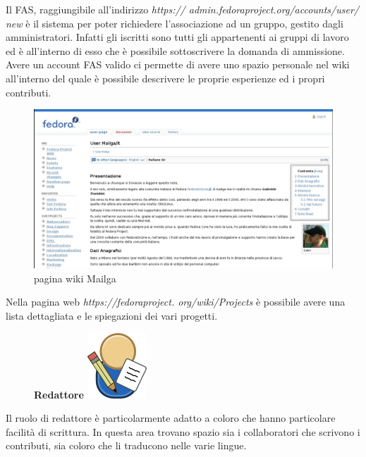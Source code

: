 Il FAS, raggiungibile all'indirizzo {\itshape https:// admin.fedoraproject.org/accounts/user/ new} è il sistema per poter richiedere l'associazione ad un gruppo, gestito dagli amministratori. Infatti gli iscritti sono tutti gli appartenenti ai gruppi di lavoro ed è all'interno di esso che è possibile sottoscrivere la domanda di ammissione.\\

Avere un account FAS valido ci permette di avere uno spazio personale nel wiki all'interno del quale è possibile descrivere le proprie esperienze ed i propri contributi. \\
\begin{figure}[htbp]
\centering
\includegraphics[scale=.20]{articoli/varie/immagini/mailga-wiki.jpeg}
\caption{pagina wiki Mailga\label{Fig.1: server git}}
\end{figure}

Nella pagina web {\itshape https://fedoraproject. org/wiki/Projects} è possibile avere una lista dettagliata e le spiegazioni dei vari progetti.\\

\begin{figure}[!h]
\centering
{\bfseries Redattore \includegraphics[scale=.30]{articoli/varie/immagini/join-writer.png}}
\end{figure}
Il ruolo di redattore è particolarmente adatto a coloro che hanno particolare facilità di scrittura. In questa area trovano spazio sia i collaboratori che scrivono i contributi, sia coloro che li traducono nelle varie lingue.\\

